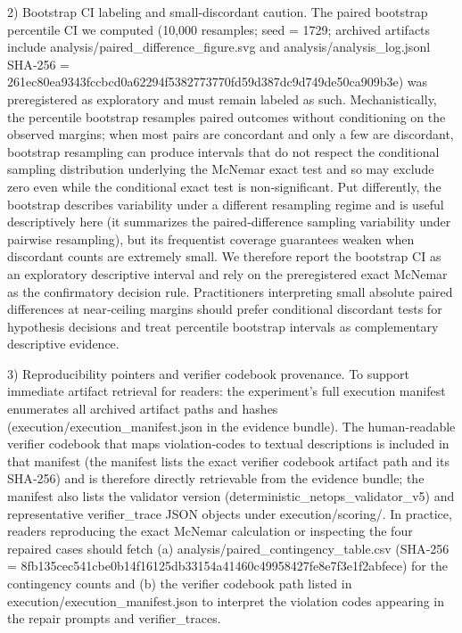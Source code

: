 \documentclass[conference]{IEEEtran}
\begin{document}
2) Bootstrap CI labeling and small‑discordant caution. The paired bootstrap percentile CI we computed (10,000 resamples; seed = 1729; archived artifacts include analysis/paired\_difference\_figure.svg and analysis/analysis\_log.jsonl SHA‑256 = 261ec80e\allowbreak{}a9343fcc\allowbreak{}bcd0a622\allowbreak{}94f53827\allowbreak{}73770fd5\allowbreak{}9d387dc9\allowbreak{}d749de50\allowbreak{}ca909b3e) was preregistered as exploratory and must remain labeled as such. Mechanistically, the percentile bootstrap resamples paired outcomes without conditioning on the observed margins; when most pairs are concordant and only a few are discordant, bootstrap resampling can produce intervals that do not respect the conditional sampling distribution underlying the McNemar exact test and so may exclude zero even while the conditional exact test is non‑significant. Put differently, the bootstrap describes variability under a different resampling regime and is useful descriptively here (it summarizes the paired‑difference sampling variability under pairwise resampling), but its frequentist coverage guarantees weaken when discordant counts are extremely small. We therefore report the bootstrap CI as an exploratory descriptive interval and rely on the preregistered exact McNemar as the confirmatory decision rule. Practitioners interpreting small absolute paired differences at near‑ceiling margins should prefer conditional discordant tests for hypothesis decisions and treat percentile bootstrap intervals as complementary descriptive evidence.

3) Reproducibility pointers and verifier codebook provenance. To support immediate artifact retrieval for readers: the experiment's full execution manifest enumerates all archived artifact paths and hashes (execution/execution\_manifest.json in the evidence bundle). The human‑readable verifier codebook that maps violation‑codes to textual descriptions is included in that manifest (the manifest lists the exact verifier codebook artifact path and its SHA‑256) and is therefore directly retrievable from the evidence bundle; the manifest also lists the validator version (deterministic\_netops\_validator\_v5) and representative verifier\_trace JSON objects under execution/scoring/. In practice, readers reproducing the exact McNemar calculation or inspecting the four repaired cases should fetch (a) analysis/paired\_contingency\_table.csv (SHA‑256 = 8fb135ce\allowbreak{}c541cbe0\allowbreak{}b14f1612\allowbreak{}5db33154\allowbreak{}a41460c4\allowbreak{}9958427f\allowbreak{}e8e7f3e1\allowbreak{}f2abfece) for the contingency counts and (b) the verifier codebook path listed in execution/execution\_manifest.json to interpret the violation codes appearing in the repair prompts and verifier\_traces.
\end{document}
